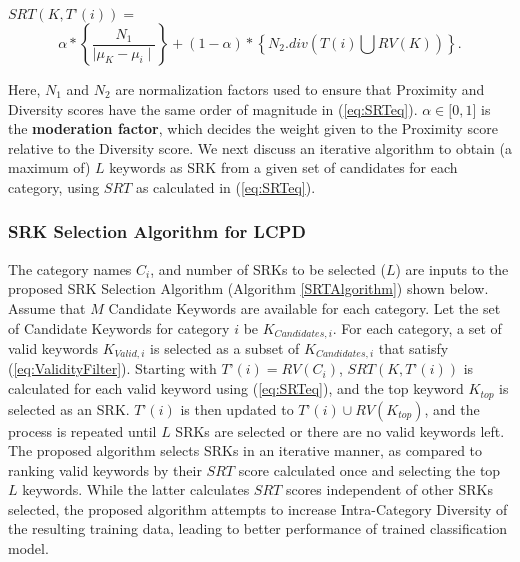 $SRT(K, T\text{'}(i)) = $
\begin{equation} \label{eq:SRTeq}
\alpha * \left\{ \frac{N_1}{\mid \mu_K - \mu_i \mid}  \right\}  + (1-\alpha)*\left\{ N_2.div(T(i) \bigcup RV(K)     )  \right\}. 
\end{equation}

Here, $N_1$ and $N_2$ are normalization factors used to ensure that Proximity and Diversity scores have the same order of magnitude in (\ref{eq:SRTeq}). $\alpha \in \lbrack 0, 1 \rbrack$ is the \textbf{moderation factor}, which decides the weight given to the Proximity score relative to the Diversity score. We next discuss an iterative algorithm to obtain (a maximum of) $L$ keywords as SRK from a given set of candidates for each category, using $SRT$ as calculated in (\ref{eq:SRTeq}). 

\subsubsection{SRK Selection Algorithm for LCPD}
\label{sec:lcpdalgo}

The category names $C_i$, and number of SRKs to be selected ($L$) are inputs to the proposed SRK Selection Algorithm (Algorithm \ref{SRTAlgorithm}) shown below. Assume that $M$ Candidate Keywords are available for each category. Let the set of Candidate Keywords for category $i$ be $K_{Candidates,i}$. For each category, a set of valid keywords $K_{Valid,i}$ is selected as a subset of $K_{Candidates,i}$ that satisfy (\ref{eq:ValidityFilter}). Starting with $T\text{'}(i)=RV(C_i)$, $SRT(K, T\text{'}(i))$ is calculated for each valid keyword using (\ref{eq:SRTeq}), and the top keyword $K_{top}$ is selected as an SRK. $T\text{'}(i)$ is then updated to {$T\text{'}(i)  \cup RV(K_{top})$}, and the process is repeated until $L$ SRKs are selected or there are no valid keywords left. The proposed algorithm selects SRKs in an iterative manner, as compared to ranking valid keywords by their $SRT$ score calculated once and selecting the top $L$ keywords. While the latter calculates $SRT$ scores independent of other SRKs selected, the proposed algorithm attempts to increase Intra-Category Diversity of the resulting training data, leading to better performance of trained classification model.

